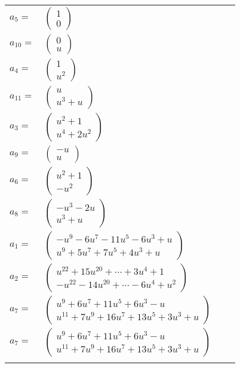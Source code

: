 \documentclass[1p]{elsarticle_modified}
\theoremstyle{definition}
\begin{document}
\begin{tabular}{m{7pt} m{180pt} m{7pt} m{180pt} }
\flushright $a_{5}=$&$\begin{pmatrix}1\\0\end{pmatrix}$ \\
\flushright $a_{10}=$&$\begin{pmatrix}0\\u\end{pmatrix}$ \\
\flushright $a_{4}=$&$\begin{pmatrix}1\\u^2\end{pmatrix}$ \\
\flushright $a_{11}=$&$\begin{pmatrix}u\\u^3+u\end{pmatrix}$ \\
\flushright $a_{3}=$&$\begin{pmatrix}u^2+1\\u^4+2 u^2\end{pmatrix}$ \\
\flushright $a_{9}=$&$\begin{pmatrix}- u\\u\end{pmatrix}$ \\
\flushright $a_{6}=$&$\begin{pmatrix}u^2+1\\- u^2\end{pmatrix}$ \\
\flushright $a_{8}=$&$\begin{pmatrix}- u^3-2 u\\u^3+u\end{pmatrix}$ \\
\flushright $a_{1}=$&$\begin{pmatrix}- u^9-6 u^7-11 u^5-6 u^3+u\\u^9+5 u^7+7 u^5+4 u^3+u\end{pmatrix}$ \\
\flushright $a_{2}=$&$\begin{pmatrix}u^{22}+15 u^{20}+\cdots+3 u^4+1\\- u^{22}-14 u^{20}+\cdots-6 u^4+u^2\end{pmatrix}$ \\
\flushright $a_{7}=$&$\begin{pmatrix}u^9+6 u^7+11 u^5+6 u^3- u\\u^{11}+7 u^9+16 u^7+13 u^5+3 u^3+u\end{pmatrix}$\\ \flushright $a_{7}=$&$\begin{pmatrix}u^9+6 u^7+11 u^5+6 u^3- u\\u^{11}+7 u^9+16 u^7+13 u^5+3 u^3+u\end{pmatrix}$\\&\end{tabular}
\end{document}
